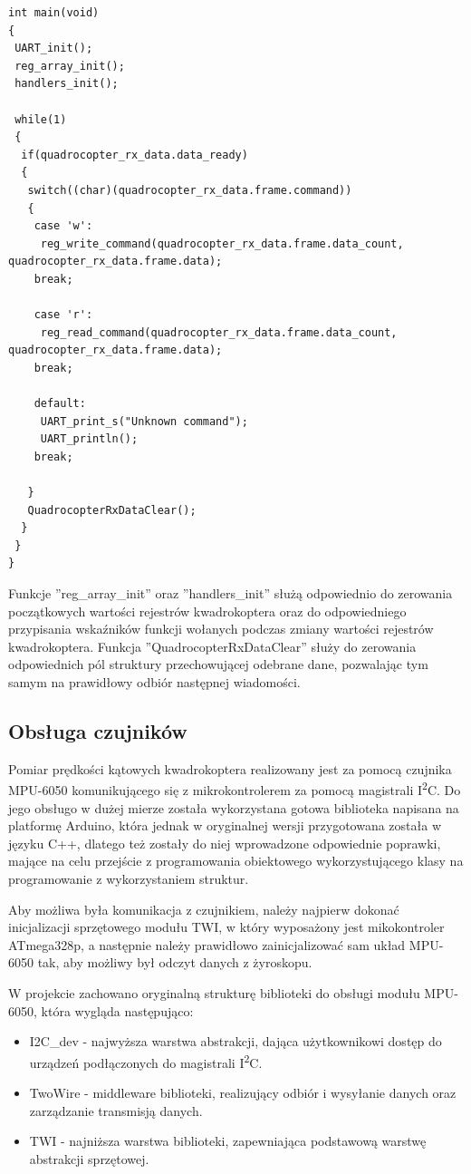 \begin{lstlisting}
int main(void)
{
 UART_init();
 reg_array_init();
 handlers_init();

 while(1)
 {
  if(quadrocopter_rx_data.data_ready)
  {
   switch((char)(quadrocopter_rx_data.frame.command))
   {
    case 'w':
     reg_write_command(quadrocopter_rx_data.frame.data_count, quadrocopter_rx_data.frame.data);
    break;
				
    case 'r':
     reg_read_command(quadrocopter_rx_data.frame.data_count, quadrocopter_rx_data.frame.data);
    break;

    default:
     UART_print_s("Unknown command");
     UART_println();
    break;

   }
   QuadrocopterRxDataClear();
  }
 }
}
\end{lstlisting}

Funkcje ''reg\_array\_init'' oraz ''handlers\_init'' służą odpowiednio do zerowania początkowych wartości rejestrów kwadrokoptera oraz do odpowiedniego przypisania wskaźników funkcji wołanych podczas zmiany wartości rejestrów kwadrokoptera. Funkcja ''QuadrocopterRxDataClear'' służy do zerowania odpowiednich pól struktury przechowującej odebrane dane, pozwalając tym samym na prawidłowy odbiór następnej wiadomości.

\subsection{Obsługa czujników}

Pomiar prędkości kątowych kwadrokoptera realizowany jest za pomocą czujnika MPU-6050 komunikującego się z mikrokontrolerem za pomocą magistrali I\textsuperscript{2}C. Do jego obsługo w dużej mierze została wykorzystana gotowa biblioteka napisana na platformę Arduino, która jednak w oryginalnej wersji przygotowana została w języku C++, dlatego też zostały do niej wprowadzone odpowiednie poprawki, mające na celu przejście z programowania obiektowego wykorzystującego klasy na programowanie z wykorzystaniem struktur. 

Aby możliwa była komunikacja z czujnikiem, należy najpierw dokonać inicjalizacji sprzętowego modułu TWI, w który wyposażony jest mikokontroler ATmega328p, a następnie należy prawidłowo zainicjalizować sam układ MPU-6050 tak, aby możliwy był odczyt danych z żyroskopu.

W projekcie zachowano oryginalną strukturę biblioteki do obsługi modułu MPU-6050, która wygląda następująco:
\begin{itemize}
	\item I2C\_dev - najwyższa warstwa abstrakcji, dająca użytkownikowi dostęp do urządzeń podłączonych do magistrali I\textsuperscript{2}C.
	\item TwoWire - middleware biblioteki, realizujący odbiór i wysyłanie danych oraz zarządzanie transmisją danych.
	\item TWI - najniższa warstwa biblioteki, zapewniająca podstawową warstwę abstrakcji sprzętowej.
\end{itemize}

